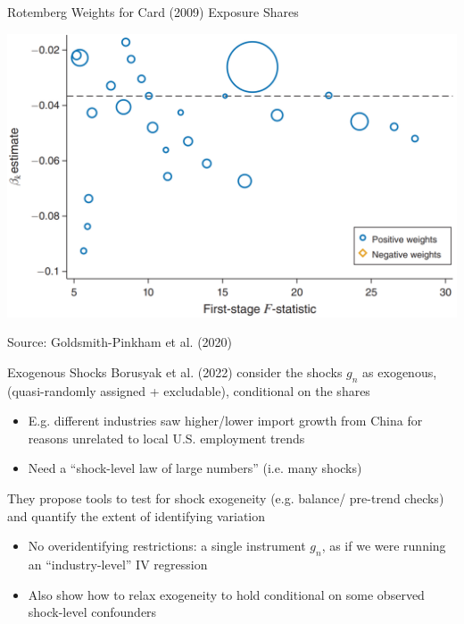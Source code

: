 \documentclass{beamer}
\begin{document}
\begin{frame}{Rotemberg Weights for Card (2009) Exposure Shares}
\begin{center}
\includegraphics[scale=0.3]{./lecture_includes/card_weights.png}
\end{center}
\vspace{-0.3cm}
Source: Goldsmith-Pinkham et al. (2020)
\end{frame}

\begin{frame}{Exogenous Shocks}
Borusyak et al. (2022) consider the shocks $g_n$ as exogenous,  (quasi-randomly assigned + excludable), conditional on the shares\smallskip
\begin{itemize}
\item E.g. different industries saw higher/lower import growth from China for reasons unrelated to local U.S. employment trends\smallskip
\item Need a ``shock-level law of large numbers'' (i.e. many shocks)
\end{itemize}\bigskip\pause{}

They propose tools to test for shock exogeneity (e.g. balance/ pre-trend checks) and quantify the extent of identifying variation \smallskip
\begin{itemize}
\item No overidentifying restrictions: a single instrument $g_n$, as if we were running an ``industry-level'' IV regression \smallskip
\item Also show how to relax exogeneity to hold conditional on some observed shock-level confounders
\end{itemize}

\end{frame}
\end{document}
